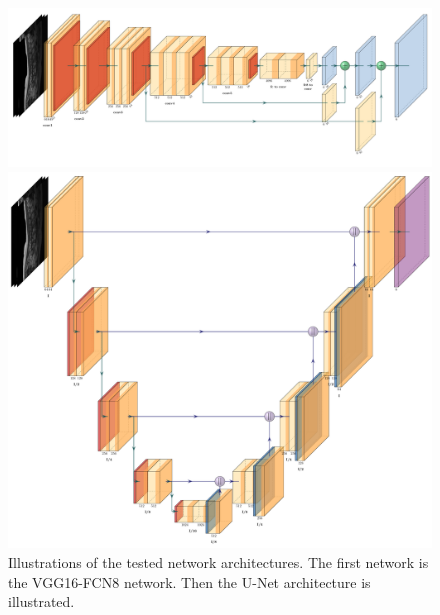 \begin{figure}
    \centering
    \centering
    \begin{minipage}{.99\textwidth}
        \includegraphics[width=.99\textwidth]{images/VGG16_FCN8.pdf}
    \end{minipage} 
    \vspace{2 mm}
    \begin{minipage}{.99\textwidth}
        \includegraphics[width=.99\textwidth]{images/UNET.pdf}
    \end{minipage} 
     
    \caption{Illustrations of the tested network architectures.
    The first network is the VGG16-FCN8 network. \newline
    Then the U-Net architecture is illustrated. 
    \label{fig:vgg16}}
\end{figure}
